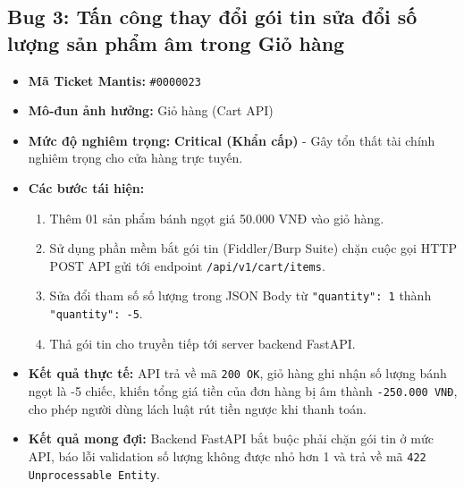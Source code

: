 \subsection{Bug 3: Tấn công thay đổi gói tin sửa đổi số lượng sản phẩm âm trong Giỏ hàng}
\begin{itemize}
    \item \textbf{Mã Ticket Mantis:} \texttt{\#0000023}
    \item \textbf{Mô-đun ảnh hưởng:} Giỏ hàng (Cart API)
    \item \textbf{Mức độ nghiêm trọng:} \textbf{Critical (Khẩn cấp)} - Gây tổn thất tài chính nghiêm trọng cho cửa hàng trực tuyến.
    \item \textbf{Các bước tái hiện:}
    \begin{enumerate}
        \item Thêm 01 sản phẩm bánh ngọt giá 50.000 VNĐ vào giỏ hàng.
        \item Sử dụng phần mềm bắt gói tin (Fiddler/Burp Suite) chặn cuộc gọi HTTP POST API gửi tới endpoint \texttt{/api/v1/cart/items}.
        \item Sửa đổi tham số số lượng trong JSON Body từ \texttt{"quantity": 1} thành \texttt{"quantity": -5}.
        \item Thả gói tin cho truyền tiếp tới server backend FastAPI.
    \end{enumerate}
    \item \textbf{Kết quả thực tế:} API trả về mã \texttt{200 OK}, giỏ hàng ghi nhận số lượng bánh ngọt là -5 chiếc, khiến tổng giá tiền của đơn hàng bị âm thành \texttt{-250.000 VNĐ}, cho phép người dùng lách luật rút tiền ngược khi thanh toán.
    \item \textbf{Kết quả mong đợi:} Backend FastAPI bắt buộc phải chặn gói tin ở mức API, báo lỗi validation số lượng không được nhỏ hơn 1 và trả về mã \texttt{422 Unprocessable Entity}.
\end{itemize}

